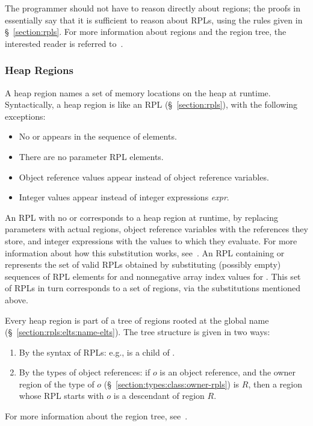 The programmer should not have to reason directly about regions; the
proofs in~\cite{DPJ:FormalTR08} essentially say that it is sufficient
to reason about RPLs, using the rules given in \S~\ref{section:rpls}.
For more information about regions and the region tree, the interested
reader is referred to~\cite{DPJ:FormalTR08}.


\subsubsection{Heap Regions}
\label{section:regions:heap}

A heap region names a set of memory locations on the heap at runtime.
Syntactically, a heap region is like an RPL (\S~\ref{section:rpls}),
with the following exceptions:
%
\begin{itemize}
%
\item No \kwd{*} or \kwd{[?]} appears in the sequence of elements.
%
\item There are no parameter RPL elements.
%
\item Object reference values appear instead of object reference variables.
%
\item Integer values \kwd{[$n$]} appear instead of integer expressions
  \kwd{[}\emph{expr}\kwd{]}.
%
\end{itemize}
%
An RPL with no \kwd{*} or \kwd{[?]} corresponds to a heap region at
runtime, by replacing parameters with actual regions, object reference
variables with the references they store, and integer expressions with
the values to which they evaluate.  For more information about how
this substitution works, see~\cite{DPJ:FormalTR08}.  An RPL containing
\kwd{*} or \kwd{[?]}  represents the set of valid RPLs obtained by
substituting (possibly empty) sequences of RPL elements for \kwd{*}
and nonnegative array index values for .  This set of RPLs in
turn corresponds to a set of regions, via the substitutions mentioned
above.

Every heap region is part of a tree of regions rooted at the global
name  (\S~\ref{section:rpls:elts:name-elts}).  The tree
structure is given in two ways:
%
\begin{enumerate}
%
\item By the syntax of RPLs: e.g.,  is a child of .
%
\item By the types of object references: if $o$ is an object
  reference, and the owner region of the type of $o$
  (\S~\ref{section:types:class:owner-rpls}) is $R$, then a region whose
  RPL starts with $o$ is a descendant of region $R$.
%
\end{enumerate}
%
For more information about the region tree, see~\cite{DPJ:FormalTR08}.


